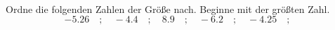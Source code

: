 \begin{aufgabe} ~ \\ 
Ordne die folgenden Zahlen der Größe nach. Beginne mit der größten Zahl.\[-5.26\quad ; \quad-4.4\quad ; \quad8.9\quad ; \quad-6.2\quad ; \quad-4.25\quad ; \quad\]\underline{\hspace{12cm}}\end{aufgabe} 
